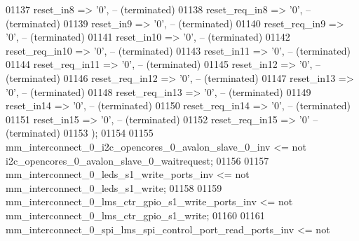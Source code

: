 \begin{DoxyCode}
01137             reset\_in8      => '0',\textcolor{keyword}{                                 -- (terminated)}
01138             reset\_req\_in8  => '0',\textcolor{keyword}{                                 -- (terminated)}
01139             reset\_in9      => '0',\textcolor{keyword}{                                 -- (terminated)}
01140             reset\_req\_in9  => '0',\textcolor{keyword}{                                 -- (terminated)}
01141             reset\_in10     => '0',\textcolor{keyword}{                                 -- (terminated)}
01142             reset\_req\_in10 => '0',\textcolor{keyword}{                                 -- (terminated)}
01143             reset\_in11     => '0',\textcolor{keyword}{                                 -- (terminated)}
01144             reset\_req\_in11 => '0',\textcolor{keyword}{                                 -- (terminated)}
01145             reset\_in12     => '0',\textcolor{keyword}{                                 -- (terminated)}
01146             reset\_req\_in12 => '0',\textcolor{keyword}{                                 -- (terminated)}
01147             reset\_in13     => '0',\textcolor{keyword}{                                 -- (terminated)}
01148             reset\_req\_in13 => '0',\textcolor{keyword}{                                 -- (terminated)}
01149             reset\_in14     => '0',\textcolor{keyword}{                                 -- (terminated)}
01150             reset\_req\_in14 => '0',\textcolor{keyword}{                                 -- (terminated)}
01151             reset\_in15     => '0',\textcolor{keyword}{                                 -- (terminated)}
01152             reset\_req\_in15 => '0'                                  \textcolor{keyword}{-- (terminated)}
01153         \textcolor{vhdlchar}{)};
01154 
01155     \textcolor{vhdlchar}{mm_interconnect_0_i2c_opencores_0_avalon_slave_0_inv} \textcolor{vhdlchar}{<=} \textcolor{keywordflow}{not} \textcolor{vhdlchar}{
      i2c_opencores_0_avalon_slave_0_waitrequest};
01156 
01157     \textcolor{vhdlchar}{mm_interconnect_0_leds_s1_write_ports_inv} \textcolor{vhdlchar}{<=} \textcolor{keywordflow}{not} \textcolor{vhdlchar}{
      mm_interconnect_0_leds_s1_write};
01158 
01159     \textcolor{vhdlchar}{mm_interconnect_0_lms_ctr_gpio_s1_write_ports_inv} \textcolor{vhdlchar}{<=} \textcolor{keywordflow}{not} \textcolor{vhdlchar}{
      mm_interconnect_0_lms_ctr_gpio_s1_write};
01160 
01161     \textcolor{vhdlchar}{mm_interconnect_0_spi_lms_spi_control_port_read_ports_inv} \textcolor{vhdlchar}{<=} \textcolor{keywordflow}{not} \textcolor{vhdlchar}{
}
\end{DoxyCode}
